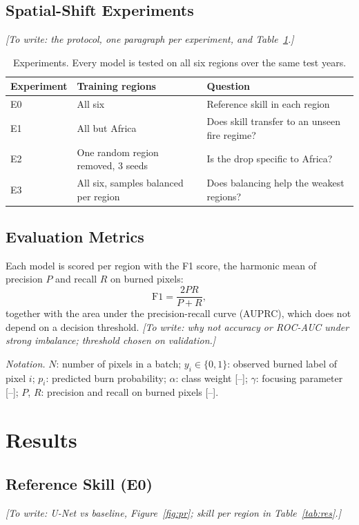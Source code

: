 \documentclass[10pt,a4paper]{article}
\newcommand\guide[1]{\textit{[To write: #1]}\par}                       %
\newcommand\dummy[1]{\lipsum[#1]\par}                                   %
\newcommand\Fone{\mathrm{F1}}
\begin{document}
\subsection{Spatial-Shift Experiments}
\guide{the protocol, one paragraph per experiment, and Table~\ref{tab:exp}.}
\dummy{16-17}
\dummy{38-39}

\begin{table}[!tb]
\centering\small
\caption{Experiments. Every model is tested on all six regions over the same test years.}
\label{tab:exp}
\begin{tabular}{lll}
\toprule
Experiment & Training regions & Question \\
\midrule
E0 & All six & Reference skill in each region \\
E1 & All but Africa & Does skill transfer to an unseen fire regime? \\
E2 & One random region removed, 3 seeds & Is the drop specific to Africa? \\
E3 & All six, samples balanced per region & Does balancing help the weakest regions? \\
\bottomrule
\end{tabular}
\end{table}

\subsection{Evaluation Metrics}
Each model is scored per region with the F1 score, the harmonic mean of precision $P$ and recall $R$ on burned pixels:
\begin{equation}
  \Fone = \frac{2PR}{P+R},
  \label{eq:f1}
\end{equation}
together with the area under the precision-recall curve (AUPRC), which does not depend on a decision threshold.
\guide{why not accuracy or ROC-AUC under strong imbalance; threshold chosen on validation.}
\dummy{18}

\textit{Notation.} $N$: number of pixels in a batch; $y_i\in\{0,1\}$: observed burned label of pixel $i$; $p_i$: predicted burn probability; $\alpha$: class weight [--]; $\gamma$: focusing parameter [--]; $P$, $R$: precision and recall on burned pixels [--].

\section{Results}
\subsection{Reference Skill (E0)}
\guide{U-Net vs baseline, Figure~\ref{fig:pr}; skill per region in Table~\ref{tab:res}.}
\dummy{19-20}
\dummy{40-41}
\end{document}
